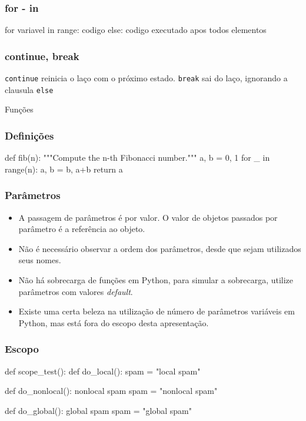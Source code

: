 \begin{frame}[fragile]
    \frametitle{for - in}
    \begin{python}
        for variavel in range:
            codigo
        else:
            codigo executado apos todos elementos
    \end{python}
\end{frame}

\begin{frame}
    \frametitle{continue, break}
    \texttt{\color{green}continue} reinicia o laço com o próximo estado.
    \texttt{\color{green}break} sai do laço, ignorando a clausula
    \texttt{\color{green}else}
\end{frame}

\begin{frame}
    \begin{center}
        \Huge Funções
    \end{center}
\end{frame}

\begin{frame}[fragile]
    \frametitle{Definições}
    \begin{python}
        def fib(n):
             """Compute the n-th Fibonacci number."""
             a, b = 0, 1
             for _ in range(n):
                 a, b = b, a+b
             return a
    \end{python}
\end{frame}

\begin{frame}
    \frametitle{Parâmetros}
    \begin{itemize}
        \item A passagem de parâmetros é por valor. O valor de
        objetos passados por parâmetro é a referência ao objeto.
        \item Não é necessário observar a ordem dos parâmetros,
        desde que sejam utilizados seus nomes.
        \item Não há sobrecarga de funções em Python, para simular
        a sobrecarga, utilize parâmetros com valores \textit{default}.
        \item Existe uma certa beleza na utilização de número de
        parâmetros variáveis em Python, mas está fora do escopo desta
        apresentação.
    \end{itemize}
\end{frame}

\begin{frame}[fragile]
    \frametitle{Escopo}
    \begin{python}
        def scope_test():
            def do_local():
                spam = "local spam"

            def do_nonlocal():
                nonlocal spam
                spam = "nonlocal spam"

            def do_global():
                global spam
                spam = "global spam"
    \end{python}
\end{frame}

